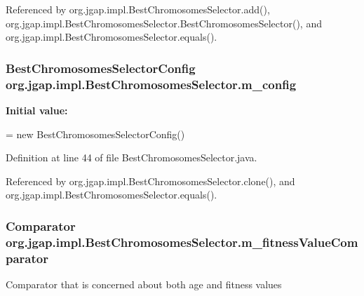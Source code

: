 Referenced by org.\-jgap.\-impl.\-Best\-Chromosomes\-Selector.\-add(), org.\-jgap.\-impl.\-Best\-Chromosomes\-Selector.\-Best\-Chromosomes\-Selector(), and org.\-jgap.\-impl.\-Best\-Chromosomes\-Selector.\-equals().

\hypertarget{classorg_1_1jgap_1_1impl_1_1_best_chromosomes_selector_a9b16ee07ecb31c2bd6b0af709cdd2248}{
\subsubsection[{m\-\_\-config}]{\setlength{\rightskip}{0pt plus 5cm}Best\-Chromosomes\-Selector\-Config org.\-jgap.\-impl.\-Best\-Chromosomes\-Selector.\-m\-\_\-config\hspace{0.3cm}{\ttfamily [private]}}}\label{classorg_1_1jgap_1_1impl_1_1_best_chromosomes_selector_a9b16ee07ecb31c2bd6b0af709cdd2248}
{\bfseries Initial value\-:}
\begin{DoxyCode}
= \textcolor{keyword}{new}
      BestChromosomesSelectorConfig()
\end{DoxyCode}


Definition at line 44 of file Best\-Chromosomes\-Selector.\-java.



Referenced by org.\-jgap.\-impl.\-Best\-Chromosomes\-Selector.\-clone(), and org.\-jgap.\-impl.\-Best\-Chromosomes\-Selector.\-equals().

\hypertarget{classorg_1_1jgap_1_1impl_1_1_best_chromosomes_selector_a22d07dd607627312855df65e2e4ea770}{
\subsubsection[{m\-\_\-fitness\-Value\-Comparator}]{\setlength{\rightskip}{0pt plus 5cm}Comparator org.\-jgap.\-impl.\-Best\-Chromosomes\-Selector.\-m\-\_\-fitness\-Value\-Comparator\hspace{0.3cm}{\ttfamily [private]}}}\label{classorg_1_1jgap_1_1impl_1_1_best_chromosomes_selector_a22d07dd607627312855df65e2e4ea770}
Comparator that is concerned about both age and fitness values 

